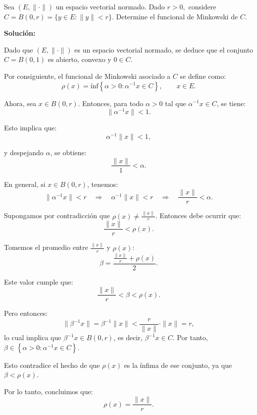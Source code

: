 Sea $(E,\|\cdot\|)$ un espacio vectorial normado. Dado $r>0,$ considere $C=B(0,r)=\{y\in E:\|y\|<r\}.$ Determine el funcional de Minkowski de $C.$


\textbf{Solución:}

Dado que $(E, \| \cdot \|)$ es un espacio vectorial normado, se deduce que el conjunto $C = B(0,1)$ es abierto, convexo y  $0 \in C$.

Por consiguiente, el funcional de Minkowski asociado a $C$ se define como:
\[
\rho(x) = \text{ínf} \left\{ \alpha > 0 : \alpha^{-1}x \in C \right\}, \qquad x \in E.
\]

Ahora, sea $x \in B(0,r)$. Entonces, para todo $\alpha > 0$ tal que $\alpha^{-1}x \in C$, se tiene:
\[
\| \alpha^{-1}x \| < 1.
\]

Esto implica que:
\[
\alpha^{-1} \| x \| < 1,
\]

y despejando $\alpha$, se obtiene:
\[
\frac{\| x \|}{1} < \alpha.
\]

En general, si $x \in B(0,r)$, tenemos:
\[
\| \alpha^{-1}x \| < r \quad \Rightarrow \quad \alpha^{-1} \| x \| < r \quad \Rightarrow \quad \frac{\| x \|}{r} < \alpha.
\]

Supongamos por contradicción que $\rho(x) \neq \frac{\| x \|}{r}$. Entonces debe ocurrir que:
\[
\frac{\| x \|}{r} < \rho(x).
\]

Tomemos el promedio entre $\frac{\| x \|}{r}$ y $\rho(x)$:
\[
\beta = \frac{\frac{\| x \|}{r} + \rho(x)}{2}.
\]

Este valor cumple que:
\[
\frac{\| x \|}{r} < \beta < \rho(x).
\]

Pero entonces:
\[
\| \beta^{-1}x \| = \beta^{-1} \| x \| < \frac{r}{\| x \|} \cdot \| x \| = r,
\]
lo cual implica que $\beta^{-1}x \in B(0,r)$, es decir, $\beta^{-1}x \in C$. Por tanto, $\beta \in \left\{ \alpha > 0 : \alpha^{-1}x \in C \right\}$.

Esto contradice el hecho de que $\rho(x)$ es la ínfima de ese conjunto, ya que $\beta < \rho(x)$.

Por lo tanto, concluimos que:
\[
\rho(x) = \frac{\| x \|}{r}.
\]